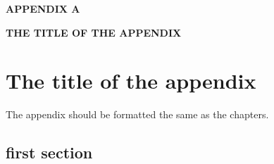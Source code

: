 
\begin{center}
    \vspace*{60pt}

    {\fontsize{18pt}{0pt} \MakeUppercase{\textbf{%
                Appendix A
            }}}
    \vspace*{24pt}

    {\fontsize{18pt}{0pt} \MakeUppercase{\textbf{%
                The title of the appendix
            }}}

    \vspace*{100pt}
\end{center}
\thispagestyle{empty}
\appendix
{}
%


\chapter{The title of the appendix}

The appendix should be formatted the same as the chapters.

\section{first section}

\lipsum[1] %


